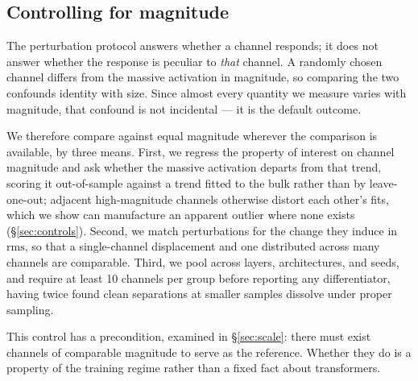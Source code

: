 \documentclass[11pt]{article}
\newcommand{\rms}{\mathrm{rms}}
\begin{document}
\subsection{Controlling for magnitude}\label{sec:control-philosophy}

The perturbation protocol answers whether a channel responds; it does not answer
whether the response is peculiar to \emph{that} channel. A randomly chosen channel
differs from the massive activation in magnitude, so comparing the two confounds
identity with size. Since almost every quantity we measure varies with magnitude,
that confound is not incidental --- it is the default outcome.

We therefore compare against equal magnitude wherever the comparison is available,
by three means. First, we regress the property of interest on channel magnitude and
ask whether the massive activation departs from that trend, scoring it out-of-sample
against a trend fitted to the bulk rather than by leave-one-out; adjacent
high-magnitude channels otherwise distort each other's fits, which we show can
manufacture an apparent outlier where none exists (\S\ref{sec:controls}). Second, we
match perturbations for the change they induce in $\rms$, so that a single-channel
displacement and one distributed across many channels are comparable. Third, we pool
across layers, architectures, and seeds, and require at least 10 channels per group
before reporting any differentiator, having twice found clean separations at smaller
samples dissolve under proper sampling.

This control has a precondition, examined in \S\ref{sec:scale}: there must exist
channels of comparable magnitude to serve as the reference. Whether they do is a
property of the training regime rather than a fixed fact about transformers.
\end{document}
